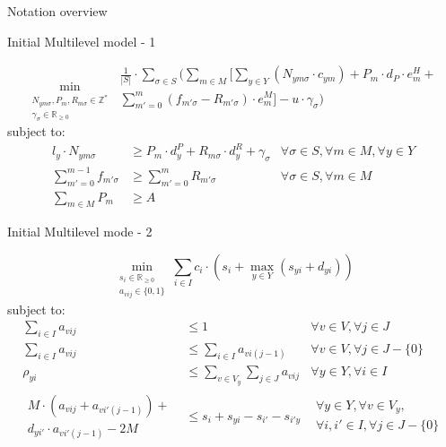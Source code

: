 \documentclass{beamer}
\begin{document}
\begin{frame}{Notation overview}
\end{frame}


\begin{frame}{Initial Multilevel model - 1}
\scriptsize

\begin{equation}
	\min_{\substack{N_{ym\sigma}, P_m, R_{m\sigma} \in \mathbb{Z}^* \\
	\gamma_\sigma \in \mathbb{R}_{\geq 0} }}
	\begin{aligned}
	\frac{1}{|S|} \cdot \sum_{\sigma \in S} ( \sum_{m \in M} [\sum_{y \in Y} 
	(N_{ym\sigma} \cdot c_{ym}) +  
	P_m \cdot d_P \cdot e^H_m + \\
	\sum_{m' = 0}^{m} (f_{m'\sigma} - R_{m'\sigma}) \cdot e^M_m ]
	- u \cdot \gamma_\sigma)
	\end{aligned}	
\end{equation}
subject to:
\begin{align}
l_y \cdot N_{ym\sigma} 			&\geq 	P_m \cdot d^P_y + R_{m\sigma} \cdot d^R_y	 + \gamma_\sigma	& \forall \sigma \in S, \forall m \in M, \forall y \in Y 		\\
\sum_{m' = 0}^{m-1} f_{m'\sigma}	&\geq 	\sum_{m' = 0}^m R_{m'\sigma}						& \forall \sigma \in S, \forall m \in M				\\
\sum_{m\in M} P_m 			&\geq 	A 										&						
\end{align}

\end{frame}

\begin{frame}{Initial Multilevel mode - 2}
\scriptsize

\begin{equation}
	\min_{\substack{s_i \in \mathbb{R}_{\geq 0} \\ 
	a_{vij} \in \{0, 1\}}} 
	\sum_{i \in I} c_i \cdot (s_i + \max_{y \in Y} (s_{yi}+ d_{yi}))
\end{equation}
subject to:
\begin{align}
\sum_{i \in I} a_{vij}						&\leq 		1						& \forall v \in V, \forall j \in J 						\\
\sum_{i \in I} a_{vij}						&\leq 		\sum_{i \in I} a_{vi(j-1)}			& \forall v \in V, \forall j \in J - \{ 0 \}					\\
\rho_{yi}								&\leq	 	\sum_{v \in V_y} \sum_{j \in J} a_{vij} 	& \forall y \in Y, \forall i \in I						\\	
\begin{aligned} M \cdot (a_{vij} + a_{vi'(j-1)}) + \\ 
d_{yi'} \cdot a_{vi'(j-1)} - 2M \end{aligned}			&\leq	 	s_i + s_{yi} - s_{i'} - s_{i'y}		& \begin{aligned} \forall y \in Y, \forall v \in V_y, 			\\
																		\forall i, i' \in I, \forall j \in J - \{ 0 \}	\end{aligned}		
\end{align}

\end{frame}
\end{document}
